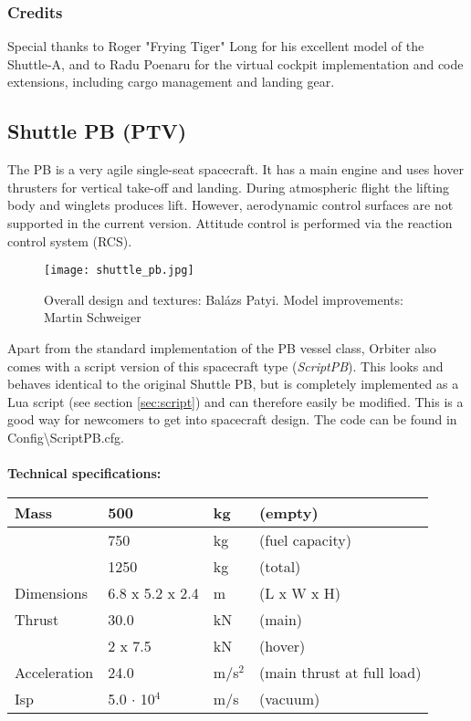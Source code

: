 \documentclass[Orbiter User Manual.tex]{subfiles}
\begin{document}
\subsubsection{Credits}
Special thanks to Roger "Frying Tiger" Long for his excellent model of the Shuttle-A, and to Radu Poenaru for the virtual cockpit implementation and code extensions, including cargo management and landing gear.


\subsection{Shuttle PB (PTV)}
The PB is a very agile single-seat spacecraft. It has a main engine and uses hover thrusters for vertical take-off and landing. During atmospheric flight the lifting body and winglets produces lift. However, aerodynamic control surfaces are not supported in the current version. Attitude control is performed via the reaction control system (RCS).\\

\begin{figure}[H]
  \centering
  \texttt{[image: shuttle\_pb.jpg]}
  \caption{Overall design and textures: Balázs Patyi. Model improvements: Martin Schweiger}
\end{figure}

\noindent
Apart from the standard implementation of the PB vessel class, Orbiter also comes with a script version of this spacecraft type (\textit{ScriptPB}). This looks and behaves identical to the original Shuttle PB, but is completely implemented as a Lua script (see section \ref{sec:script}) and can therefore easily be modified. This is a good way for newcomers to get into spacecraft design. The code can be found in Config\textbackslash ScriptPB.cfg.\\
\\
\textbf{Technical specifications:}

	\begin{longtable}{ |p{}|p{}|p{}|p{}| }
	\hline\rule{0pt}{2ex}
	Mass & 500 & kg & (empty)\\
	\hline\rule{0pt}{2ex}
	& 750 & kg & (fuel capacity)\\
	\hline\rule{0pt}{2ex}
	& 1250 & kg & (total)\\
	\hline\rule{0pt}{2ex}
	Dimensions & 6.8 x 5.2 x 2.4 & m & (L x W x H)\\
	\hline\rule{0pt}{2ex}
	Thrust & 30.0 & kN & (main)\\
	\hline\rule{0pt}{2ex}
	& 2 x 7.5 & kN & (hover)\\
	\hline\rule{0pt}{2ex}
	Acceleration & 24.0 & m/s$^{2}$ & (main thrust at full load)\\
	\hline\rule{0pt}{2ex}
	Isp & 5.0 $\cdot$ 10$^{4}$ & m/s & (vacuum)\\
	\hline
	\end{longtable}
\end{document}
